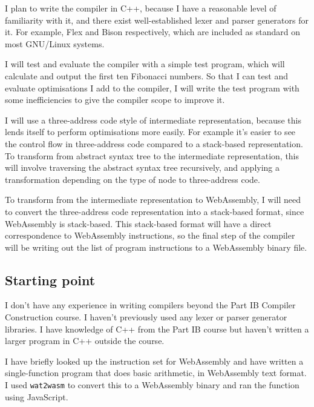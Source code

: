 \documentclass[12pt,a4paper]{article}
\begin{document}
I plan to write the compiler in C++, because I have a reasonable level of familiarity with it, and there exist well-established lexer and parser generators for it. For example, Flex and Bison respectively, which are included as standard on most GNU/Linux systems.

I will test and evaluate the compiler with a simple test program, which will calculate and output the first ten Fibonacci numbers. So that I can test and evaluate optimisations I add to the compiler, I will write the test program with some inefficiencies to give the compiler scope to improve it.



I will use a three-address code style of intermediate representation, because this lends itself to perform optimisations more easily. For example it's easier to see the control flow in three-address code compared to a stack-based representation.
To transform from abstract syntax tree to the intermediate representation, this will involve traversing the abstract syntax tree recursively, and applying a transformation depending on the type of node to three-address code.



To transform from the intermediate representation to WebAssembly, I will need to convert the three-address code representation into a stack-based format, since WebAssembly is stack-based. This stack-based format will have a direct correspondence to WebAssembly instructions, so the final step of the compiler will be writing out the list of program instructions to a WebAssembly binary file. 





\subsection*{Starting point}

I don't have any experience in writing compilers beyond the Part IB Compiler Construction course. I haven't previously used any lexer or parser generator libraries. I have knowledge of C++ from the Part IB course but haven't written a larger program in C++ outside the course.

I have briefly looked up the instruction set for WebAssembly and have written a single-function program that does basic arithmetic, in WebAssembly text format. I used \texttt{wat2wasm} to convert this to a WebAssembly binary and ran the function using JavaScript.
\end{document}
